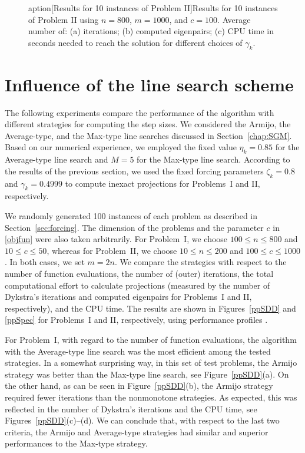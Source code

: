 \begin{figure}[H]
aption[Results for 10 instances of Problem II]{Results for 10 instances of Problem II using $n=800$, $m=1000$, and $c=100$. Average number of: (a) iterations; (b) computed eigenpairs; (c)  CPU time in seconds needed to reach the solution for different choices of $\gamma_k$.}
	\label{Spec}
\end{figure}

\section{Influence of the line search scheme}

The following experiments compare the performance of the algorithm with different strategies for computing the step sizes. We considered the Armijo, the Average-type, and the Max-type line searches discussed in Section~\ref{chap:SGM}. 
Based on our numerical experience, we employed the fixed value $\eta_k=0.85$ for the Average-type line search and $M=5$ for the Max-type line search. 
According to the results of the previous section, we used the fixed forcing parameters $\zeta_k=0.8$ and $\gamma_k=0.4999$ to compute inexact projections for Problems~I and II, respectively.

We randomly generated 100 instances of each problem as described in Section~\ref{sec:forcing}. The dimension of the problems and the parameter $c$ in \eqref{objfun} were also taken arbitrarily. For Problem~I, we choose $100\leq n \leq 800$ and $10\leq c \leq 50$, whereas for Problem~II, we choose $10\leq n \leq 200$ and $100\leq c \leq 1000$. In both cases, we set $m=2n$.
We compare the strategies with respect to the number of function evaluations, the number of (outer) iterations, the total computational effort to calculate projections (measured by the number of Dykstra’s iterations and computed eigenpairs for Problems~I and II, respectively), and the CPU time. The results are shown in Figures~\ref{ppSDD} and \ref{ppSpec} for Problems~I and II, respectively, using performance profiles \cite{dolan2002benchmarking}.

For Problem~I, with regard to the number of function evaluations, the algorithm with the Average-type line search was the most efficient among the tested strategies.
In a somewhat surprising way, in this set of test problems, the Armijo strategy was better than the Max-type line search, see Figure~\ref{ppSDD}(a).
On the other hand, as can be seen in Figure~\ref{ppSDD}(b), the Armijo strategy required fewer iterations than the nonmonotone strategies.
As expected, this was reflected in the number of Dykstra’s iterations and the CPU time, see Figures~\ref{ppSDD}(c)--(d).
We can conclude that, with respect to the last two criteria, the Armijo and Average-type strategies had similar and superior performances to the Max-type strategy.

